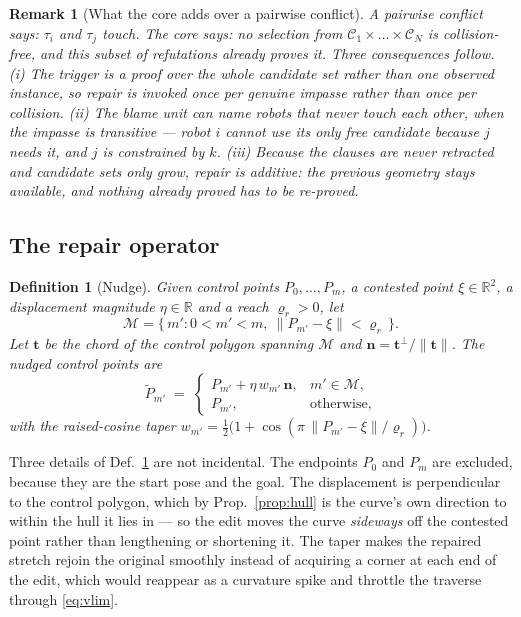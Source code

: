 \documentclass[conference]{IEEEtran}
\newtheorem{definition}{Definition}
\newtheorem{remark}{Remark}
\newcommand{\R}{\mathbb{R}}
\newcommand{\Cand}{\mathcal{C}}
\begin{document}
\begin{remark}[What the core adds over a pairwise conflict]
\label{rem:corevspair}
A pairwise conflict says: \emph{$\tau_i$ and $\tau_j$ touch}. The core says: \emph{no
selection from $\Cand_1 \times \dots \times \Cand_N$ is collision-free, and this subset of
refutations already proves it}. Three consequences follow.
(i) The trigger is a proof over the whole candidate set rather than one observed instance,
so repair is invoked once per genuine impasse rather than once per collision.
(ii) The blame unit can name robots that never touch each other, when the impasse is
transitive --- robot $i$ cannot use its only free candidate because $j$ needs it, and $j$ is
constrained by $k$.
(iii) Because the clauses are never retracted and candidate sets only grow, repair is
\emph{additive}: the previous geometry stays available, and nothing already proved has to be
re-proved.
\end{remark}

\subsection{The repair operator}
\label{sec:repair}

\begin{definition}[Nudge]
\label{def:nudge}
Given control points $P_0,\dots,P_m$, a contested point $\xi \in \R^2$, a displacement
magnitude $\eta \in \R$ and a reach $\varrho_r > 0$, let
\[
  \mathcal{M} = \{\, m' : 0 < m' < m,\ \lVert P_{m'} - \xi\rVert < \varrho_r \,\}.
\]
Let $\mathbf{t}$ be the chord of the control polygon spanning $\mathcal{M}$ and
$\mathbf{n} = \mathbf{t}^{\perp}/\lVert\mathbf{t}\rVert$. The nudged control points are
\begin{equation}
  \tilde P_{m'} \;=\;
  \begin{cases}
    P_{m'} + \eta\, w_{m'} \,\mathbf{n}, & m' \in \mathcal{M},\\[2pt]
    P_{m'}, & \text{otherwise,}
  \end{cases}
  \label{eq:nudge}
\end{equation}
with the raised-cosine taper
$w_{m'} = \tfrac12\big(1 + \cos(\pi\,\lVert P_{m'}-\xi\rVert/\varrho_r)\big)$.
\end{definition}

Three details of Def.~\ref{def:nudge} are not incidental. The endpoints $P_0$ and $P_m$ are
excluded, because they are the start pose and the goal. The displacement is perpendicular to
the control polygon, which by Prop.~\ref{prop:hull} is the curve's own direction to within
the hull it lies in --- so the edit moves the curve \emph{sideways} off the contested point
rather than lengthening or shortening it. The taper makes the repaired stretch rejoin the
original smoothly instead of acquiring a corner at each end of the edit, which would
reappear as a curvature spike and throttle the traverse through \eqref{eq:vlim}.
\end{document}
